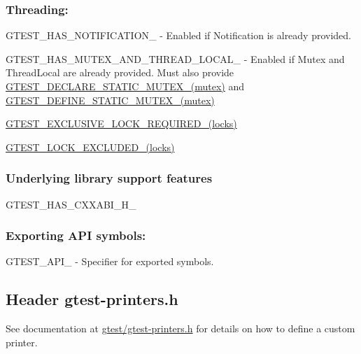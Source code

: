 \subsubsection*{Threading\+:}


\begin{DoxyItemize}
\item {\ttfamily G\+T\+E\+S\+T\+\_\+\+H\+A\+S\+\_\+\+N\+O\+T\+I\+F\+I\+C\+A\+T\+I\+O\+N\+\_\+} -\/ Enabled if Notification is already provided.
\item {\ttfamily G\+T\+E\+S\+T\+\_\+\+H\+A\+S\+\_\+\+M\+U\+T\+E\+X\+\_\+\+A\+N\+D\+\_\+\+T\+H\+R\+E\+A\+D\+\_\+\+L\+O\+C\+A\+L\+\_\+} -\/ Enabled if {\ttfamily Mutex} and {\ttfamily Thread\+Local} are already provided. Must also provide {\ttfamily \mbox{\hyperlink{gtest-port_8h_af0970cdea09f16dbb1dbfccdaa693eeb}{G\+T\+E\+S\+T\+\_\+\+D\+E\+C\+L\+A\+R\+E\+\_\+\+S\+T\+A\+T\+I\+C\+\_\+\+M\+U\+T\+E\+X\+\_\+(mutex)}}} and {\ttfamily \mbox{\hyperlink{gtest-port_8h_a85d5cd679fdbe87383e7dfd1c6651eaa}{G\+T\+E\+S\+T\+\_\+\+D\+E\+F\+I\+N\+E\+\_\+\+S\+T\+A\+T\+I\+C\+\_\+\+M\+U\+T\+E\+X\+\_\+(mutex)}}}
\item {\ttfamily \mbox{\hyperlink{gtest-port_8h_a149f693bd59fa1bc937af54c0cdcb32f}{G\+T\+E\+S\+T\+\_\+\+E\+X\+C\+L\+U\+S\+I\+V\+E\+\_\+\+L\+O\+C\+K\+\_\+\+R\+E\+Q\+U\+I\+R\+E\+D\+\_\+(locks)}}}
\item {\ttfamily \mbox{\hyperlink{gtest-port_8h_a69abff5a4efdd07bd5faebe3dd318d06}{G\+T\+E\+S\+T\+\_\+\+L\+O\+C\+K\+\_\+\+E\+X\+C\+L\+U\+D\+E\+D\+\_\+(locks)}}}
\end{DoxyItemize}

\subsubsection*{Underlying library support features}


\begin{DoxyItemize}
\item {\ttfamily G\+T\+E\+S\+T\+\_\+\+H\+A\+S\+\_\+\+C\+X\+X\+A\+B\+I\+\_\+\+H\+\_\+}
\end{DoxyItemize}

\subsubsection*{Exporting A\+PI symbols\+:}


\begin{DoxyItemize}
\item {\ttfamily G\+T\+E\+S\+T\+\_\+\+A\+P\+I\+\_\+} -\/ Specifier for exported symbols.
\end{DoxyItemize}

\subsection*{Header {\ttfamily gtest-\/printers.\+h}}


\begin{DoxyItemize}
\item See documentation at {\ttfamily \mbox{\hyperlink{gtest-printers_8h}{gtest/gtest-\/printers.\+h}}} for details on how to define a custom printer. 
\end{DoxyItemize}